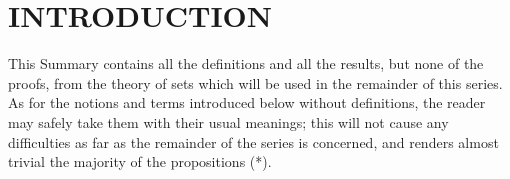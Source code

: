 \section*{INTRODUCTION}
{}
\setcounter{section}{0}

This Summary contains all the definitions and all the results, but none of the proofs, from the theory of sets which will be used in the remainder of this series. As for the notions and terms introduced below without definitions, the reader may safely take them with their usual meanings; this will not cause any difficulties as far as the remainder of the series is concerned, and renders almost trivial the majority of the propositions (*).

